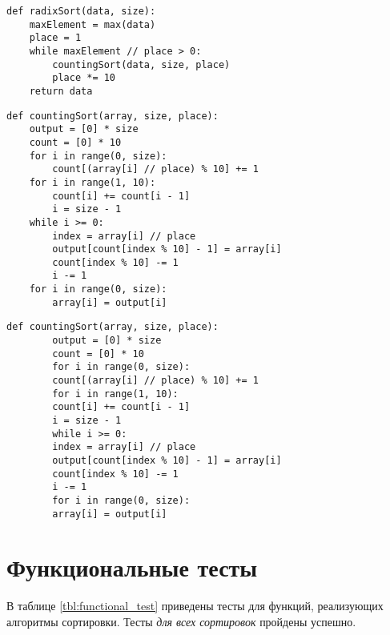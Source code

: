 \begin{center}
\captionsetup{justification=raggedright,singlelinecheck=off}
\begin{lstlisting}[label=lst:radix_sort,caption=Алгоритм поразрядной сортировки]
def radixSort(data, size):
	maxElement = max(data)
	place = 1
	while maxElement // place > 0:
		countingSort(data, size, place)
		place *= 10
	return data
\end{lstlisting}
\end{center}


\begin{center}
\captionsetup{justification=raggedright,singlelinecheck=off}
\begin{lstlisting}[label=lst:counting_sort,caption=Алгоритм сортировки подсчётом]
def countingSort(array, size, place):
	output = [0] * size
	count = [0] * 10
	for i in range(0, size):
		count[(array[i] // place) % 10] += 1
	for i in range(1, 10):
		count[i] += count[i - 1]
		i = size - 1
	while i >= 0:
		index = array[i] // place
		output[count[index % 10] - 1] = array[i]
		count[index % 10] -= 1
		i -= 1
	for i in range(0, size):
		array[i] = output[i]
\end{lstlisting}
\end{center}

\begin{center}
	\captionsetup{justification=raggedright,singlelinecheck=off}
	\begin{lstlisting}[label=lst:bst_sort,caption=Алгоритм сортировки подсчётом]
		def countingSort(array, size, place):
		output = [0] * size
		count = [0] * 10
		for i in range(0, size):
		count[(array[i] // place) % 10] += 1
		for i in range(1, 10):
		count[i] += count[i - 1]
		i = size - 1
		while i >= 0:
		index = array[i] // place
		output[count[index % 10] - 1] = array[i]
		count[index % 10] -= 1
		i -= 1
		for i in range(0, size):
		array[i] = output[i]
	\end{lstlisting}
\end{center}

\section{Функциональные тесты}

В таблице \ref{tbl:functional_test} приведены тесты для функций, реализующих алгоритмы сортировки. Тесты \textit{для всех сортировок} пройдены успешно.


